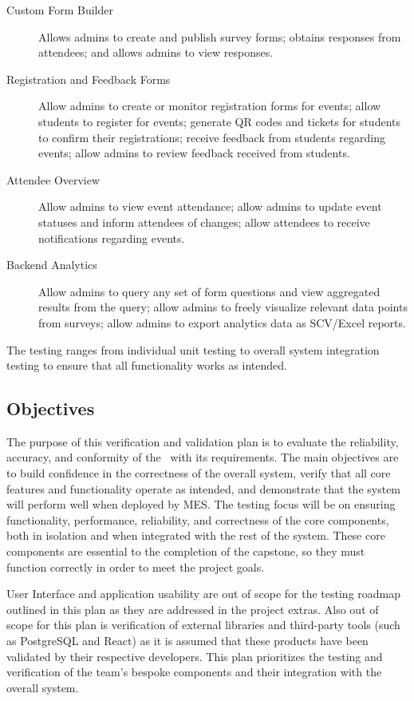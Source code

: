 \documentclass[12pt, titlepage]{article}
\begin{document}
\begin{description}
  \item[Custom Form Builder] Allows admins to create and publish survey forms; obtains responses from attendees; and
    allows admins to view responses.
  \item[Registration and Feedback Forms] Allow admins to create or monitor registration forms for events; allow students
    to register for events; generate QR codes and tickets for students to confirm their registrations; receive feedback
    from students regarding events; allow admins to review feedback received from students.
  \item[Attendee Overview] Allow admins to view event attendance; allow admins to update event statuses and inform
    attendees of changes; allow attendees to receive notifications regarding events.
  \item[Backend Analytics] Allow admins to query any set of form questions and view aggregated results from the query;
    allow admins to freely visualize relevant data points from surveys; allow admins to export analytics data as
    SCV/Excel reports.
\end{description}

\noindent The testing ranges from individual unit testing to overall system integration testing to ensure that all functionality
works as intended.
\subsection{Objectives}

The purpose of this verification and validation plan is to evaluate the reliability, accuracy, and conformity of the
\teamname~with its requirements. The main objectives are to build confidence in the correctness of the overall system,
verify that all core features and functionality operate as intended, and demonstrate that the system will perform well
when deployed by MES. The testing focus will be on ensuring functionality, performance, reliability, and correctness of
the core components, both in isolation and when integrated with the rest of the system. These core components are
essential to the completion of the capstone, so they must function correctly in order to meet the project goals.

User Interface and application usability are out of scope for the testing roadmap outlined in this plan as they are
addressed in the project extras. Also out of scope for this plan is verification of external libraries and third-party
tools (such as PostgreSQL and React) as it is assumed that these products have been validated by their respective
developers. This plan prioritizes the testing and verification of the team's bespoke components and their integration
with the overall system.
\end{document}

